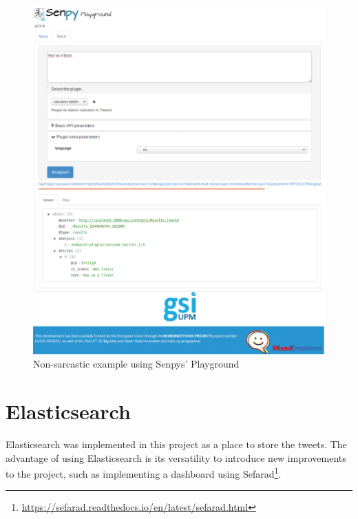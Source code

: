 \begin{figure}
	\includegraphics[width=\linewidth]{img/noironia.png}
	\caption{Non-sarcastic example using Senpys' Playground~\cite{senpy}}
	\label{fig:senpyex2}
\end{figure}
\section{Elasticsearch}
\label{sec:elastic}
Elasticsearch was implemented in this project as a place to store the tweets. The advantage of using Elasticsearch is its versatility to introduce new improvements to the project, such as implementing a dashboard using Sefarad\footnote{\url{https://sefarad.readthedocs.io/en/latest/sefarad.html}}.
